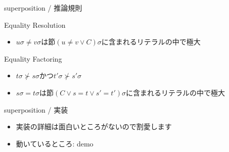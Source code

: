 \documentclass[dvipdfmx,11pt,notheorems]{beamer}
\theoremstyle{definition}
\begin{document}
\begin{frame}{superposition / 推論規則}
  \begin{block}{Equality Resolution}
    \begin{prooftree}
    \end{prooftree}

    \begin{itemize}
      \item $u\sigma\not=v\sigma$は節$(u\not=v \lor C)\sigma$に含まれるリテラルの中で極大
    \end{itemize}
  \end{block}

  \begin{block}{Equality Factoring}
    \begin{prooftree}
    \end{prooftree}

    \begin{itemize}
      \item $t\sigma \not\succ s\sigma$かつ$t'\sigma \not\succ s'\sigma$
      \item $s\sigma = t\sigma$は節$(C \lor s=t \lor s'=t')\sigma$に含まれるリテラルの中で極大
    \end{itemize}
  \end{block}
\end{frame}

\begin{frame}{superposition / 実装}
  \begin{itemize}
    \item 実装の詳細は面白いところがないので割愛します
    \item 動いているところ: demo
  \end{itemize}
\end{frame}
\end{document}
